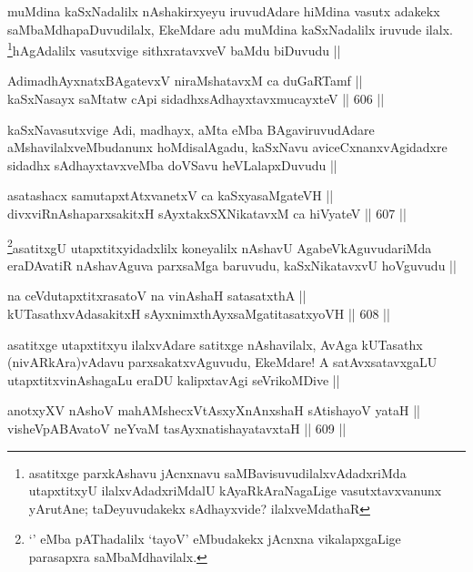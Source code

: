 \begin{artha}
muMdina kaSxNadalilx nAshakirxyeyu iruvudAdare hiMdina vasutx adakekx saMbaMdhapaDuvudilalx, EkeMdare adu muMdina kaSxNadalilx iruvude ilalx. \footnote{asatitxge parxkAshavu jAcnxnavu saMBavisuvudilalxvAdadxriMda utapxtitxyU ilalxvAdadxriMdalU kAyaRkAraNagaLige vasutxtavxvanunx yArutAne; taDeyuvudakekx sAdhayxvide? ilalxveMdathaR}hAgAdalilx vasutxvige sithxratavxveV baMdu biDuvudu ||
\end{artha}

\begin{shl}
AdimadhAyxnatxBAgatevxV niraMshatavxM ca duGaRTamf || \\
kaSxNasayx saMtatw cApi sidadhxsAdhayxtavxmucayxteV ||  606 ||  
\end{shl}

\begin{artha}
kaSxNavasutxvige Adi, madhayx, aMta eMba BAgaviruvudAdare aMshavilalxveMbudanunx hoMdisalAgadu, kaSxNavu aviceCxnanxvAgidadxre sidadhx sAdhayxtavxveMba doVSavu heVLalapxDuvudu ||
\end{artha}

\begin{shl}
asatashacx samutapxtAtxvanetxV ca kaSxyasaMgateVH || \\
divxviRnAshaparxsakitxH sAyxtakxSXNikatavxM ca hiVyateV ||  607 ||  
\end{shl}	

\begin{artha}
\footnote{`\stext' eMba pAThadalilx `tayoV' eMbudakekx jAcnxna vikalapxgaLige parasapxra saMbaMdhavilalx.}asatitxgU utapxtitxyidadxlilx koneyalilx nAshavU AgabeVkAguvudariMda eraDAvatiR nAshavAguva parxsaMga baruvudu, kaSxNikatavxvU hoVguvudu ||
\end{artha}

\begin{shl}
na ceVdutapxtitxrasatoV na vinAshaH satasatxthA || \\
kUTasathxvAdasakitxH sAyxnimxthAyxsaMgatitasatxyoVH ||  608 ||  
\end{shl}

\begin{artha}
asatitxge utapxtitxyu ilalxvAdare satitxge nAshavilalx, AvAga kUTasathx (nivARkAra)vAdavu parxsakatxvAguvudu, EkeMdare! A satAvxsatavxgaLU utapxtitxvinAshagaLu eraDU kalipxtavAgi seVrikoMDive ||
\end{artha}

\begin{shl}
anotxyXV nAshoV mahAMshecxVtAsxyXnAnxshaH sAtishayoV yataH || \\
visheVpABAvatoV neYvaM tasAyxnatishayatavxtaH ||  609 || 
\end{shl}


